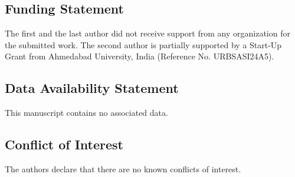 \documentclass[12pt]{amsart}
\theoremstyle{plain}
\theoremstyle{definition}
\begin{document}
\subsection*{Funding Statement}

The first and the last author did not receive support from any organization for the submitted work. The second author is partially supported by a Start-Up Grant from Ahmedabad University, India (Reference No. URBSASI24A5).


\subsection*{Data Availability Statement} This manuscript contains no associated data.

\subsection*{Conflict of Interest} The authors declare that there are no known conflicts of interest.
\end{document}
